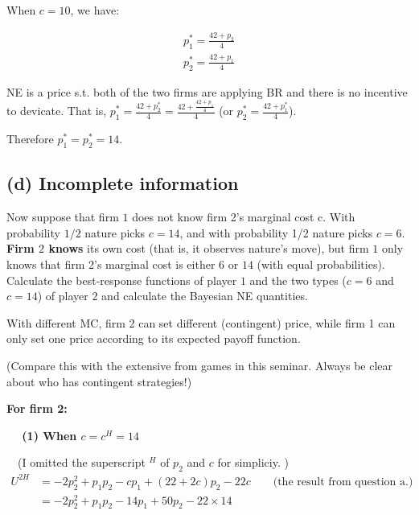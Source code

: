 \documentclass{article}
\begin{document}
\medskip

When $c = 10$, we have:

\begin{align*}
p^*_1 = \frac{42+p_2}{4} \\
p^*_2 = \frac{42+p_1}{4}
\end{align*}

NE is a price s.t. both of the two firms are applying BR and there is no incentive to devicate.
That is, $p^*_1 = \frac{42+p^*_2}{4} =\frac{42+\frac{42+p_1}{4}}{4}$ (or $p^*_2 = \frac{42+p^*_1}{4}$).

Therefore $p^*_1 = p^*_2 =14$.

\subsection*{(d) Incomplete information} Now suppose that firm $1$ does not know firm 2's marginal cost c. With
probability $1/2$ nature picks $c = 14$, and with probability 1/2 nature
picks $c = 6$. \textbf{Firm $2$ knows} its own cost (that is, it observes nature's
move), but firm $1$ only knows that firm 2's marginal cost is either $6$ or
$14$ (with equal probabilities). Calculate the best-response functions of
player $1$ and the two types ($c = 6$ and $c = 14$) of player $2$ and calculate
the Bayesian NE quantities.

\bigskip

\begin{mdframed}[backgroundcolor=blue!20,linecolor=white]
With different MC, firm 2 can set different (contingent) price, while firm 1 can only set one price according to its expected payoff function.
\medskip

(Compare this with the extensive from games in this seminar. Always be clear about who has contingent strategies!)

\end{mdframed}

\textbf{For firm 2:}

\medskip

\textbf{$\quad $ (1) When $c=c^H=14$}

\smallskip

$\quad $(I omitted the superscript $^H$ of $p_2$ and $c$ for simpliciy. )
\begin{align*}
U^{2H} &= -2p_2^2 +p_1p_2 -cp_1 + (22+2c)p_2 -22c \quad \quad \text{(the result from question a.)}  \\
&= -2p_2^2 +p_1p_2 -14p_1 + 50p_2 -22 \times 14
\end{align*}
\end{document}
